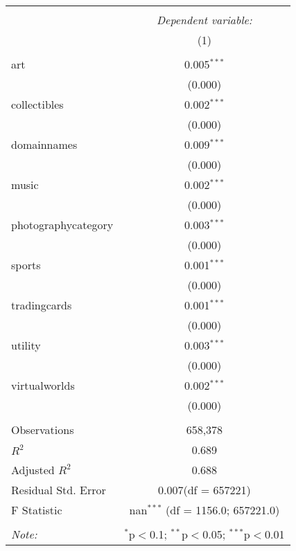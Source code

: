 \begin{table}[!htbp] \centering
\begin{tabular}{@{\extracolsep{5pt}}lc}
\\[-1.8ex]\hline
\hline \\[-1.8ex]
& \multicolumn{1}{c}{\textit{Dependent variable:}} \
\cr \cline{1-2}
\\[-1.8ex] & (1) \\
\hline \\[-1.8ex]
 art & 0.005$^{***}$ \\
  & (0.000) \\
 collectibles & 0.002$^{***}$ \\
  & (0.000) \\
 domainnames & 0.009$^{***}$ \\
  & (0.000) \\
 music & 0.002$^{***}$ \\
  & (0.000) \\
 photographycategory & 0.003$^{***}$ \\
  & (0.000) \\
 sports & 0.001$^{***}$ \\
  & (0.000) \\
 tradingcards & 0.001$^{***}$ \\
  & (0.000) \\
 utility & 0.003$^{***}$ \\
  & (0.000) \\
 virtualworlds & 0.002$^{***}$ \\
  & (0.000) \\
\hline \\[-1.8ex]
 Observations & 658,378 \\
 $R^2$ & 0.689 \\
 Adjusted $R^2$ & 0.688 \\
 Residual Std. Error & 0.007(df = 657221)  \\
 F Statistic & nan$^{***}$ (df = 1156.0; 657221.0) \\
\hline
\hline \\[-1.8ex]
\textit{Note:} & \multicolumn{1}{r}{$^{*}$p$<$0.1; $^{**}$p$<$0.05; $^{***}$p$<$0.01} \\
\end{tabular}
\end{table}